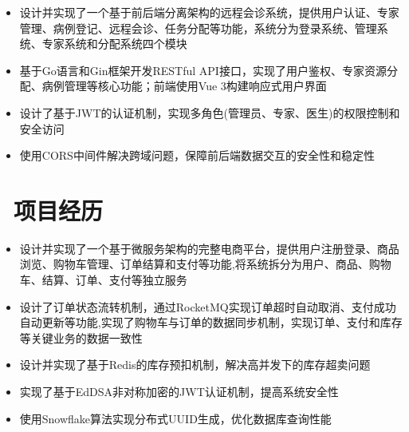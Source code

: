 \documentclass{resume}
\begin{document}
\begin{onehalfspacing}
\begin{itemize}
  \item  设计并实现了一个基于前后端分离架构的远程会诊系统，提供用户认证、专家管理、病例登记、远程会诊、任务分配等功能，系统分为登录系统、管理系统、专家系统和分配系统四个模块
  \item 基于Go语言和Gin框架开发RESTful API接口，实现了用户鉴权、专家资源分配、病例管理等核心功能；前端使用Vue 3构建响应式用户界面
  \item 设计了基于JWT的认证机制，实现多角色(管理员、专家、医生)的权限控制和安全访问
  \item 使用CORS中间件解决跨域问题，保障前后端数据交互的安全性和稳定性
\end{itemize}
\end{onehalfspacing}





\vspace{-1ex}


\section{\faSitemap\ 项目经历}


\begin{onehalfspacing}
\begin{itemize}
  \item 设计并实现了一个基于微服务架构的完整电商平台，提供用户注册登录、商品浏览、购物车管理、订单结算和支付等功能,将系统拆分为用户、商品、购物车、结算、订单、支付等独立服务
  \item 设计了订单状态流转机制，通过RocketMQ实现订单超时自动取消、支付成功自动更新等功能,实现了购物车与订单的数据同步机制，实现订单、支付和库存等关键业务的数据一致性
  \item 设计并实现了基于Redis的库存预扣机制，解决高并发下的库存超卖问题
  \item 实现了基于EdDSA非对称加密的JWT认证机制，提高系统安全性
  \item 使用Snowflake算法实现分布式UUID生成，优化数据库查询性能
\end{itemize}
\end{onehalfspacing}
\end{document}
